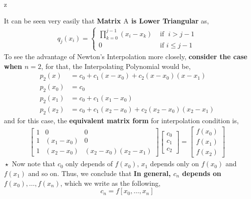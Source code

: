 z\documentclass[a4paper,12pt,twoside]{book}
\newcommand{\nll}[0]{\newline\newline}
\newcommand{\mat}[1]{\bm{\mathrm{#1}}}
\begin{document}
\nll
It can be seen very easily that \textbf{Matrix $\mat{A}$ is Lower Triangular} as,
\begin{equation}
    \begin{split}
        q_j(x_i) = \begin{cases}\prod_{k=0}^{j-1} (x_i-x_k) & \text{ if }\; i> j-1\\
        0 & \text{ if } i\le j-1\end{cases}
    \end{split}
\end{equation}
To see the advantage of Newton's Interpolation more closely, \textbf{consider the case when $n=2$}, for that, the Interpolating Polynomial would be,
\begin{equation}
    \begin{split}
        p_2(x) &= c_0 + c_1(x-x_0) + c_2(x-x_0)(x-x_1)\\
        p_2(x_0)&= c_0\\
        p_2(x_1)&= c_0 + c_1(x_1 -x_0)\\
        p_2(x_2) &= c_0 + c_1(x_2 -x_0) + c_2 (x_2 - x_0)(x_2 - x_1)
    \end{split}
\end{equation}
and for this case, the \textbf{equivalent matrix form} for interpolation condition is,
\begin{equation}
    \begin{split}
        \begin{bmatrix} 1 & 0 & 0 \\ 
                        1 & (x_1-x_0) & 0 \\
                        1& (x_2 - x_0) & (x_2 -x_0)(x_2-x_1) 
        \end{bmatrix} \begin{bmatrix} c_0 \\ c_1 \\c_2 \end{bmatrix} = \begin{bmatrix} f(x_0) \\ f(x_1) \\ f(x_2)\end{bmatrix}
    \end{split}
\end{equation}
$\boxed{\star}$ Now note that $c_0$ only depends of $f(x_0)$, $x_1$ depends only on $f(x_0)$ and $f(x_1)$ and so on. Thus, we conclude that \textbf{In general, $c_n$ depends on $f(x_0),\dots,f(x_n)$}, which we write as the following,
\begin{equation}
    \boxed{c_n = f[x_0,\dots,x_n]}
\end{equation}
\end{document}
